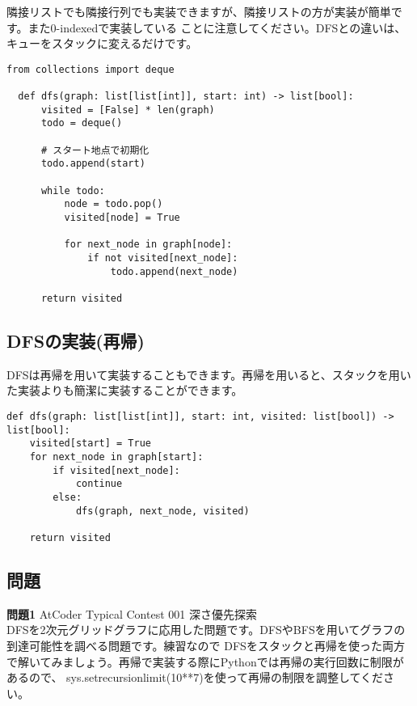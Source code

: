 \documentclass{jlreq}
\begin{document}
隣接リストでも隣接行列でも実装できますが、隣接リストの方が実装が簡単です。また0-indexedで実装している
ことに注意してください。DFSとの違いは、キューをスタックに変えるだけです。

\begin{lstlisting}[caption=深さ優先探索ヒープの実装, label=dfs, frame=TRBL, label={dfs}]
  from collections import deque

  def dfs(graph: list[list[int]], start: int) -> list[bool]:
      visited = [False] * len(graph)
      todo = deque()
      
      # スタート地点で初期化
      todo.append(start)
      
      while todo:
          node = todo.pop()
          visited[node] = True
          
          for next_node in graph[node]:
              if not visited[next_node]:
                  todo.append(next_node)
                  
      return visited
\end{lstlisting}
\subsection{DFSの実装(再帰)}
DFSは再帰を用いて実装することもできます。再帰を用いると、スタックを用いた実装よりも簡潔に実装することができます。

\begin{lstlisting}[caption=深さ優先探索再帰の実装, label=dfs_recursive, frame=TRBL, label={dfs_recursive}]
def dfs(graph: list[list[int]], start: int, visited: list[bool]) -> list[bool]:   
    visited[start] = True
    for next_node in graph[start]:
        if visited[next_node]:
            continue
        else:
            dfs(graph, next_node, visited)
    
    return visited
\end{lstlisting}

\subsection{問題}
\textbf{問題1} AtCoder Typical Contest 001 深さ優先探索 \\
DFSを2次元グリッドグラフに応用した問題です。DFSやBFSを用いてグラフの到達可能性を調べる問題です。練習なので
DFSをスタックと再帰を使った両方で解いてみましょう。再帰で実装する際にPythonでは再帰の実行回数に制限があるので、
sys.setrecursionlimit(10**7)を使って再帰の制限を調整してください。 \\
\end{document}
